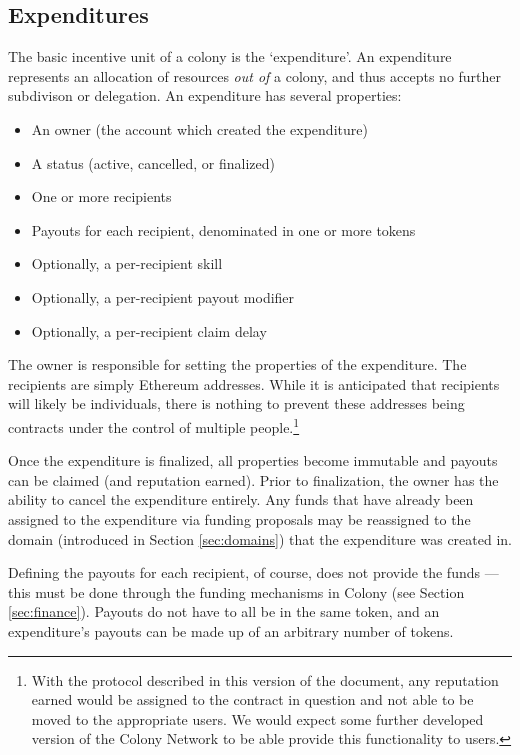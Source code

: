 \subsection{Expenditures}\label{sec:expenditures}

The basic incentive unit of a colony is the `expenditure'. An expenditure represents an allocation of resources \textit{out of} a colony, and thus accepts no further subdivison or delegation. An expenditure has several properties:

\begin{itemize}
\item An owner (the account which created the expenditure)
\item A status (active, cancelled, or finalized)
\item One or more recipients
\item Payouts for each recipient, denominated in one or more tokens
\item Optionally, a per-recipient skill
\item Optionally, a per-recipient payout modifier
\item Optionally, a per-recipient claim delay
\end{itemize}

The owner is responsible for setting the properties of the expenditure. The recipients are simply Ethereum addresses. While it is anticipated that recipients will likely be individuals, there is nothing to prevent these addresses being contracts under the control of multiple people.\footnote{With the protocol described in this version of the document, any reputation earned would be assigned to the contract in question and not able to be moved to the appropriate users. We would expect some further developed version of the Colony Network to be able provide this functionality to users.}

Once the expenditure is finalized, all properties become immutable and payouts can be claimed (and reputation earned). Prior to finalization, the owner has the ability to cancel the expenditure entirely. Any funds that have already been assigned to the expenditure via funding proposals may be reassigned to the domain (introduced in Section \ref{sec:domains}) that the expenditure was created in.

Defining the payouts for each recipient, of course, does not provide the funds --- this must be done through the funding mechanisms in Colony (see Section \ref{sec:finance}). Payouts do not have to all be in the same token, and an expenditure's payouts can be made up of an arbitrary number of tokens.

